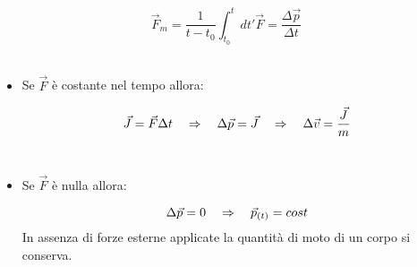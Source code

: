 \begin{equation}
\vec F_m = \frac1{t-t_0}\int_{t_0}^tdt'\vec F = \frac{\Delta\vec p}{\Delta t}
\end{equation}
\\
\begin{itemize}
    \item Se $\vec F$ è costante nel tempo allora:
    
    \begin{equation}
        \vec J = \vec F\Delta t\quad\Rightarrow\quad\Delta\vec p = \vec J \quad\Rightarrow\quad\Delta\vec v
        = \frac{\vec J}m
    \end{equation}
    \\\item Se $\vec F$ è nulla allora:
    
    \begin{equation}
        \Delta\vec p = 0\quad\Rightarrow\quad\vec p_{(t)} = cost
    \end{equation}
    In assenza di forze esterne applicate la quantità di moto di un corpo si conserva.
\end{itemize}